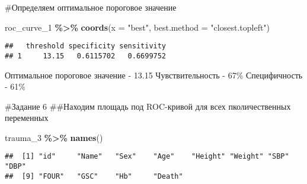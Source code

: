 \documentclass[
]{article}
\newenvironment{Shaded}{\begin{snugshade}}{\end{snugshade}}
\newcommand{\AttributeTok}[1]{\textcolor[rgb]{0.13,0.29,0.53}{#1}}
\newcommand{\FunctionTok}[1]{\textcolor[rgb]{0.13,0.29,0.53}{\textbf{#1}}}
\newcommand{\NormalTok}[1]{#1}
\newcommand{\SpecialCharTok}[1]{\textcolor[rgb]{0.81,0.36,0.00}{\textbf{#1}}}
\newcommand{\StringTok}[1]{\textcolor[rgb]{0.31,0.60,0.02}{#1}}
\begin{document}
\#Определяем оптимальное пороговое значение

\begin{Shaded}
\begin{Highlighting}[]
\NormalTok{roc\_curve\_1 }\SpecialCharTok{\%\textgreater{}\%} \FunctionTok{coords}\NormalTok{(}\AttributeTok{x =} \StringTok{"best"}\NormalTok{, }\AttributeTok{best.method =} \StringTok{"closest.topleft"}\NormalTok{)}
\end{Highlighting}
\end{Shaded}

\begin{verbatim}
##   threshold specificity sensitivity
## 1     13.15   0.6115702   0.6699752
\end{verbatim}

Оптимальное пороговое значение - 13.15 Чувствительность - 67\%
Специфичность - 61\%

\#Задание 6 \#\#Находим площадь под ROC-кривой для всех пколичественных
переменных

\begin{Shaded}
\begin{Highlighting}[]
\NormalTok{trauma\_3 }\SpecialCharTok{\%\textgreater{}\%} \FunctionTok{names}\NormalTok{()}
\end{Highlighting}
\end{Shaded}

\begin{verbatim}
##  [1] "id"     "Name"   "Sex"    "Age"    "Height" "Weight" "SBP"    "DBP"   
##  [9] "FOUR"   "GSC"    "Hb"     "Death"
\end{verbatim}
\end{document}
